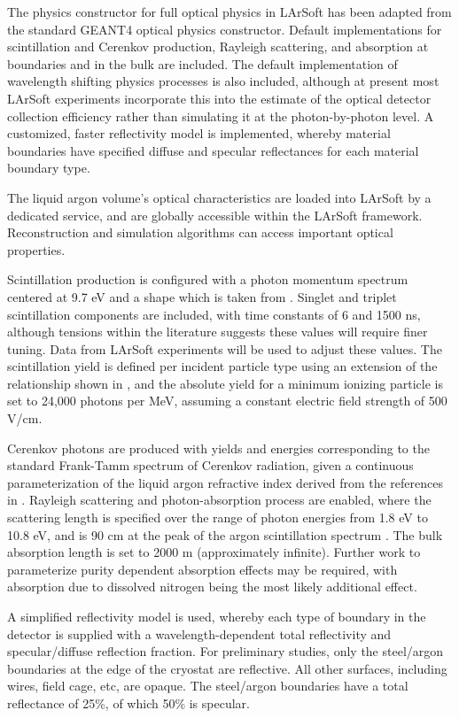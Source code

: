 \documentclass[12pt]{elsarticle}
\begin{document}
The physics constructor for full optical physics in LArSoft has been adapted from the standard GEANT4 optical physics constructor. Default implementations for scintillation and Cerenkov production, Rayleigh scattering, and absorption at boundaries and in the bulk are included. The default implementation of wavelength shifting physics processes is also included, although at present most LArSoft experiments incorporate this into the estimate of the optical detector collection efficiency rather than simulating it at the photon-by-photon level.  A customized, faster reflectivity model is implemented, whereby material boundaries have specified diffuse and specular reflectances for each material boundary type.  

The liquid argon volume's optical characteristics are loaded into LArSoft by a dedicated service, and are globally accessible within the LArSoft framework.  Reconstruction and simulation algorithms can access important optical properties.

Scintillation production is configured with a photon momentum spectrum centered at 9.7 eV and a shape which is taken from \cite{spectrum}.  Singlet and triplet scintillation components are included, with time constants of 6 and 1500 ns, although tensions within the literature suggests these values will require finer tuning.\cite{fastslow} Data from LArSoft experiments will be used to adjust these values.  The scintillation yield is defined per incident particle type using an extension of the relationship shown in \cite{scintyield}, and the absolute yield for a minimum ionizing particle is set to 24,000 photons per MeV, assuming a constant electric field strength of 500 V/cm. 

Cerenkov photons are produced with yields and energies corresponding to the standard Frank-Tamm spectrum of Cerenkov radiation, given a continuous parameterization of the liquid argon refractive index derived from the references in \cite{RIndex}. Rayleigh scattering and photon-absorption process are enabled, where the scattering length is specified over the range of photon energies from 1.8 eV to 10.8 eV, and is 90 cm at the peak of the argon scintillation spectrum \cite{Rlength}.  The bulk absorption length is set to 2000 m (approximately infinite). Further work to parameterize purity dependent absorption effects may be required, with absorption due to dissolved nitrogen being the most likely additional effect\cite{nitrogen}.

A simplified reflectivity model is used, whereby each type of boundary in the detector is supplied with a wavelength-dependent total reflectivity and specular/diffuse reflection fraction.   For  preliminary  studies,  only the  steel/argon boundaries  at  the  edge of the cryostat are  reflective. All  other  surfaces,  including  wires,  field cage,  etc,  are opaque.  The steel/argon boundaries have a total reflectance of 25\%, of which 50\% is specular\cite{reflectances}.
\end{document}
